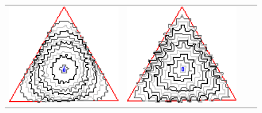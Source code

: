 \begin{figure}
\begin{tabular}{p{2.5em}ccc}
\includegraphics[scale=0.24]{figures/chapter6/radius-effect/triangle/improve/len_pen0.5/radius-5/summary.pdf} &
\includegraphics[scale=0.24]{figures/chapter6/radius-effect/triangle/improve/len_pen0.5/radius-9/summary.pdf} \\[2em]

\end{tabular}
\end{figure}
